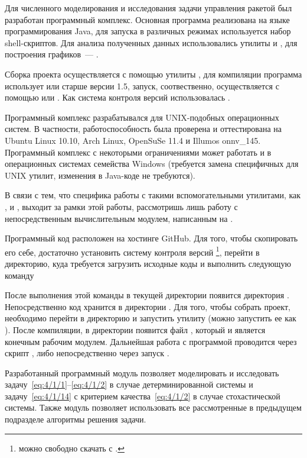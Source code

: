 Для численного моделирования и исследования задачи управления ракетой был разработан программный комплекс. Основная программа реализована на языке программирования Java, для запуска в различных режимах используется набор shell-скриптов. Для анализа полученных данных использовались утилиты  и , для построения графиков~--- .

Сборка проекта осуществляется с помощью утилиты , для компиляции программа использует  или  старше версии 1.5, запуск, соотвественно, осуществляется с помощью  или . Как система контроля версий использовалась .

Программный комплекс разрабатывался для UNIX-подобных операционных систем. В частности, работоспособность была проверена и оттестирована на Ubuntu Linux 10.10, Arch Linux, OpenSuSe 11.4 и Illumos onnv\_145. Программный комплекс с некоторыми ограничениями может работать и в операционных системах семейства Windows (требуется замена специфичных для UNIX утилит, изменения в Java-коде не требуются).

В связи с тем, что специфика работы с такими вспомогательными утилитами, как ,  и , выходит за рамки этой работы, рассмотришь лишь работу с непосредственным вычислительным модулем, написанным на .

\br

Программный код расположен на хостинге GitHub. Для того, чтобы скопировать его себе, достаточно установить систему контроля версий \footnote{ можно свободно скачать с .}, перейти в директорию, куда требуется загрузить исходные коды и выполнить следующую команду


После выполнения этой команды в текущей директории появится директория . Непосредственно код хранится в директории . Для того, чтобы собрать проект, необходимо перейти в директорию  и запустить утилиту  (можно запустить ее как ). После компиляции, в директории появится файл , который и является конечным рабочим модулем. Дальнейшая работа с программой проводится через скрипт , либо непосредственно через запуск .

\br

Разработанный программный модуль позволяет моделировать и исследовать задачу~\ref{eq:4/1/1}--\vref{eq:4/1/2} в случае детерминированной системы и задачу~\vref{eq:4/1/14} с критерием качества~\ref{eq:4/1/2} в случае стохастической системы. Также модуль позволяет использовать все рассмотренные в предыдущем подразделе алгоритмы решения задачи.

